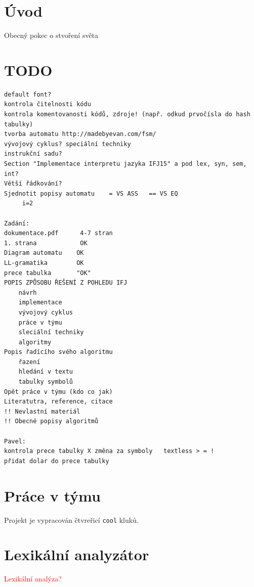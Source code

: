 \documentclass[a4paper, 12pt]{article}
\begin{document}
\tableofcontents
\newpage
\section{Úvod} \label{uvod}
Obecný pokec o stvoření světa
\section{TODO} \label{todo}
\begin{verbatim}
default font?
kontrola čitelnosti kódu
kontrola komentovanosti kódů, zdroje! (např. odkud prvočísla do hash tabulky)
tvorba automatu http://madebyevan.com/fsm/
vývojový cyklus? speciální techniky
instrukční sadu?
Section "Implementace interpretu jazyka IFJ15" a pod lex, syn, sem, int?
Větší řádkování?
Sjednotit popisy automatu    = VS ASS   == VS EQ
     i=2

Zadání:
dokumentace.pdf      4-7 stran
1. strana            OK
Diagram automatu    OK
LL-gramatika        OK
prece tabulka       "OK"
POPIS ZPŮSOBU ŘEŠENÍ Z POHLEDU IFJ
    návrh
    implementace
    vývojový cyklus
    práce v týmu
    sleciální techniky
    algoritmy
Popis řadícího svého algoritmu
    řazení
    hledání v textu
    tabulky symbolů
Opět práce v týmu (kdo co jak)
Literatutra, reference, citace
!! Nevlastní materiál
!! Obecné popisy algoritmů

Pavel:
kontrola prece tabulky X změna za symboly 	textless > = !
přidat dolar do prece tabulky
\end{verbatim}
\newpage
\section{Práce v týmu} \label{team}

Projekt je vypracován čtvreřicí \texttt{cool} kluků.
\section{Lexikální analyzátor} \label{lexer}
\textcolor{red}{Lexikální analýza?}
\end{document}
